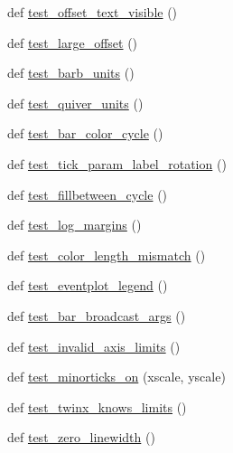\begin{DoxyCompactItemize}
\item 
def \hyperlink{namespacematplotlib_1_1tests_1_1test__axes_a14e83083d1a7f68ac99f4b6d305b1c2c}{test\+\_\+offset\+\_\+text\+\_\+visible} ()
\item 
def \hyperlink{namespacematplotlib_1_1tests_1_1test__axes_aa10248247a02f579190dee589046b6c7}{test\+\_\+large\+\_\+offset} ()
\item 
def \hyperlink{namespacematplotlib_1_1tests_1_1test__axes_ad735cf848a112383316e1a63023a7f67}{test\+\_\+barb\+\_\+units} ()
\item 
def \hyperlink{namespacematplotlib_1_1tests_1_1test__axes_ab8d3afa446444d500cff2256c885a75c}{test\+\_\+quiver\+\_\+units} ()
\item 
def \hyperlink{namespacematplotlib_1_1tests_1_1test__axes_a3c9e3d5a1229d3400608482b945c9684}{test\+\_\+bar\+\_\+color\+\_\+cycle} ()
\item 
def \hyperlink{namespacematplotlib_1_1tests_1_1test__axes_a4dcbd200b0f5efea3d0a250f5996ddb5}{test\+\_\+tick\+\_\+param\+\_\+label\+\_\+rotation} ()
\item 
def \hyperlink{namespacematplotlib_1_1tests_1_1test__axes_a5c4f65d561e011e6cadf794d0c5a4401}{test\+\_\+fillbetween\+\_\+cycle} ()
\item 
def \hyperlink{namespacematplotlib_1_1tests_1_1test__axes_aa00f985e4ff53da69fb557e98e1870d3}{test\+\_\+log\+\_\+margins} ()
\item 
def \hyperlink{namespacematplotlib_1_1tests_1_1test__axes_aa975b34efb84bc8ac98ab54cc7d6891d}{test\+\_\+color\+\_\+length\+\_\+mismatch} ()
\item 
def \hyperlink{namespacematplotlib_1_1tests_1_1test__axes_a602e56b3b2e6ba505425bad2850310ff}{test\+\_\+eventplot\+\_\+legend} ()
\item 
def \hyperlink{namespacematplotlib_1_1tests_1_1test__axes_acd942624355bf63499faeff55558e233}{test\+\_\+bar\+\_\+broadcast\+\_\+args} ()
\item 
def \hyperlink{namespacematplotlib_1_1tests_1_1test__axes_ac037799535e53d2a9e706a7763fff63f}{test\+\_\+invalid\+\_\+axis\+\_\+limits} ()
\item 
def \hyperlink{namespacematplotlib_1_1tests_1_1test__axes_a13993fd203742b5efc38f00059838275}{test\+\_\+minorticks\+\_\+on} (xscale, yscale)
\item 
def \hyperlink{namespacematplotlib_1_1tests_1_1test__axes_ae3ab35ed303814cd1e44b2b0f53c4fce}{test\+\_\+twinx\+\_\+knows\+\_\+limits} ()
\item 
def \hyperlink{namespacematplotlib_1_1tests_1_1test__axes_ac79c12c3b214d1827e87d9c5c786ddcc}{test\+\_\+zero\+\_\+linewidth} ()

\end{DoxyCompactItemize}
